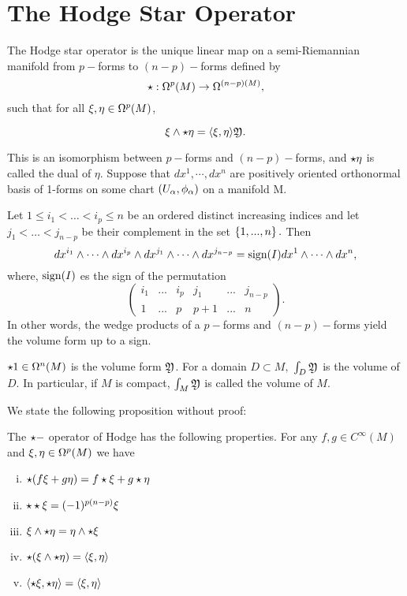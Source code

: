 \section{The Hodge Star Operator}

\begin{defn}
 \label{SA:3.2.1}
The Hodge star operator is the unique linear map on a semi-Riemannian manifold from $p-$forms to $(n-p)-$forms defined
by
$$
\star: \Omega^{p}(M) \to \Omega^{(n-p)(M)},
$$
such that for all $\xi, \eta \in \Omega^{p}(M)$,

$$\xi \wedge \star \eta =\langle \xi, \eta\rangle\mathfrak{Y}.$$
\end{defn}


This is an isomorphism between $p-$forms and $(n-p)-$forms, and $\star \eta$ is called the dual of $\eta.$ Suppose that
$dx^{1}, \cdots, dx^{n}$ are positively oriented orthonormal basis of 1-forms on some chart $(U_{\alpha}, \phi_{\alpha})$
on a manifold M.

Let $1 \leq i_{1} < \dots < i_{p} \leq n$ be an ordered distinct increasing indices and let $j_{1}< \dots <j_{n-p}$ be
their complement in the set $\left\{ 1,...,n \right\}.$ Then
\begin{equation}
\label{SA:3.8}
 dx^{i_{1}} \wedge \cdots \wedge dx^{i_{p}}\wedge dx^{j_{1}}\wedge \cdots \wedge dx^{j_{n-p}}= \operatorname{sign}(I)dx^{1}\wedge \cdots \wedge
dx^{n},
\end{equation}
where, $\operatorname{sign}(I)$ es the sign of the permutation
$$
\begin{pmatrix}
i_{1} & ... & i_{p} & j_{1} & ... & j_{n-p} \\
1 & ... & p & p+1 & ... & n
\end{pmatrix}.
$$
 In other words, the wedge products of a $p-$forms and $(n-p)-$forms yield the volume form up to a sign.

\begin{rem}
 $\star 1 \in \Omega^{n}(M)$ is the volume form $\mathfrak{Y}$. For a domain $D\subset M,$ $\int_{D} \mathfrak{Y}$ is the volume of
$D.$ In particular, if $M$ is compact, $\int_{M}\mathfrak{Y}$ is called the volume of $M.$
\end{rem}

We state the following proposition without proof:

\begin{prop}[\cite{SM}, 4.7]
\label{SM:4.7}
 The $\star-$ operator of Hodge has the following properties. For any $f, g \in C^{\infty}(M)$ and $\xi, \eta \in
\Omega^{p}(M)$ we have
\begin{enumerate}[(i)]
 \item $\star(f\xi + g \eta)= f \star \xi + g \star \eta$
\item $\star \star \xi = (-1)^{p(n-p)} \xi$
\item $\xi \wedge \star \eta= \eta \wedge \star \xi$
\item $\star (\xi \wedge \star \eta)= \langle \xi, \eta\rangle$
\item $\langle \star \xi, \star \eta\rangle=\langle \xi, \eta\rangle$
\end{enumerate}
\end{prop}

